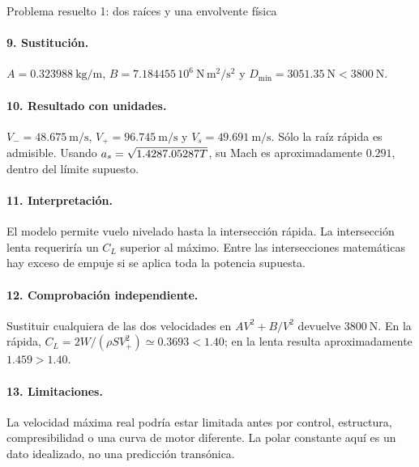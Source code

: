\begin{studiumworked}{Problema resuelto 1: dos raíces y una envolvente física}
\paragraph{9. Sustitución.} $A=0.323988\ \mathrm{kg/m}$, $B=7.184455\,10^6\ \mathrm{N\,m^2/s^2}$ y $D_{\min}=3051.35\ \mathrm N<3800\ \mathrm N$.
\paragraph{10. Resultado con unidades.} $V_-=48.675\ \mathrm{m/s}$, $V_+=96.745\ \mathrm{m/s}$ y $V_s=49.691\ \mathrm{m/s}$. Sólo la raíz rápida es admisible. Usando $a_s=\sqrt{1.4287.05287 T}$, su Mach es aproximadamente $0.291$, dentro del límite supuesto.
\paragraph{11. Interpretación.} El modelo permite vuelo nivelado hasta la intersección rápida. La intersección lenta requeriría un $C_L$ superior al máximo. Entre las intersecciones matemáticas hay exceso de empuje si se aplica toda la potencia supuesta.
\paragraph{12. Comprobación independiente.} Sustituir cualquiera de las dos velocidades en $AV^2+B/V^2$ devuelve $3800\ \mathrm N$. En la rápida, $C_L=2W/(\rho SV_+^2)\simeq0.3693<1.40$; en la lenta resulta aproximadamente $1.459>1.40$.
\paragraph{13. Limitaciones.} La velocidad máxima real podría estar limitada antes por control, estructura, compresibilidad o una curva de motor diferente. La polar constante aquí es un dato idealizado, no una predicción transónica.


\end{studiumworked}

